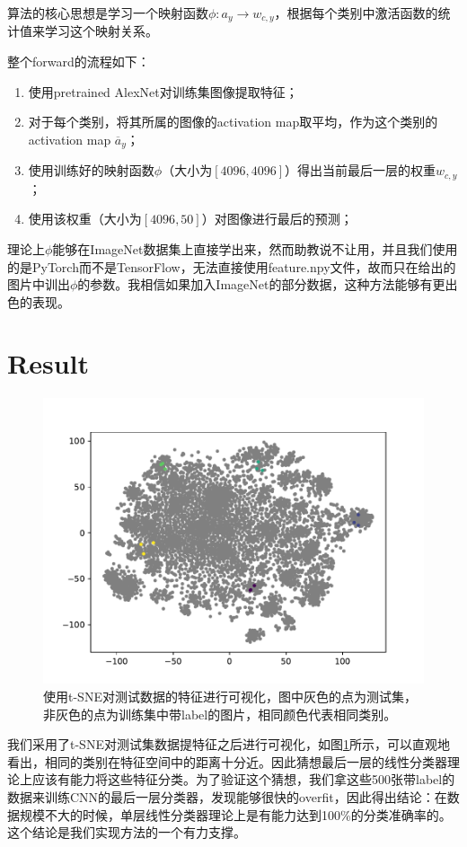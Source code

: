 \documentclass[a4paper]{article}
\begin{document}
算法的核心思想是学习一个映射函数$\phi:a_y\to w_{c,y}$，根据每个类别中激活函数的统计值来学习这个映射关系。

整个forward的流程如下：

\begin{enumerate}
	\item 使用pretrained AlexNet对训练集图像提取特征；
	\item 对于每个类别，将其所属的图像的activation map取平均，作为这个类别的activation map $\overline{a}_y$；
	\item 使用训练好的映射函数$\phi$（大小为$[4096,4096]$）得出当前最后一层的权重$w_{c,y}$；
	\item 使用该权重（大小为$[4096,50]$）对图像进行最后的预测；
\end{enumerate}

理论上$\phi$能够在ImageNet数据集上直接学出来，然而助教说不让用，并且我们使用的是PyTorch而不是TensorFlow，无法直接使用feature.npy文件，故而只在给出的图片中训出$\phi$的参数。我相信如果加入ImageNet的部分数据，这种方法能够有更出色的表现。

\section{Result}

\begin{figure}[htp]
\centering
\includegraphics[width=0.7\linewidth]{tsnepca.pdf}
\caption{使用t-SNE\cite{tsne}对测试数据的特征进行可视化，图中灰色的点为测试集，非灰色的点为训练集中带label的图片，相同颜色代表相同类别。}
\label{tsne}
\end{figure}

我们采用了t-SNE\cite{tsne}对测试集数据提特征之后进行可视化，如图\ref{tsne}所示，可以直观地看出，相同的类别在特征空间中的距离十分近。因此猜想最后一层的线性分类器理论上应该有能力将这些特征分类。为了验证这个猜想，我们拿这些500张带label的数据来训练CNN的最后一层分类器，发现能够很快的overfit，因此得出结论：在数据规模不大的时候，单层线性分类器理论上是有能力达到100\%的分类准确率的。这个结论是我们实现方法的一个有力支撑。
\end{document}

